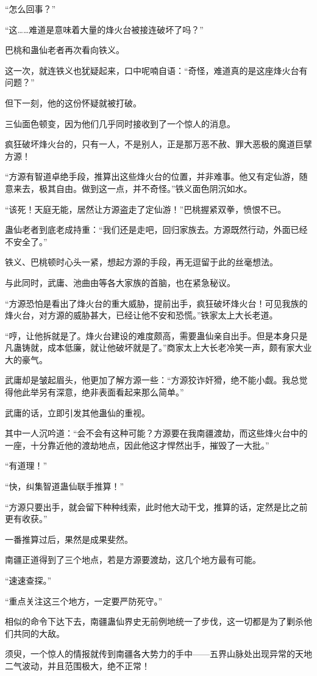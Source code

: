 \begin{this_body}
“怎么回事？”

“这……难道是意味着大量的烽火台被接连破坏了吗？”

巴桃和蛊仙老者再次看向铁义。

这一次，就连铁义也犹疑起来，口中呢喃自语：“奇怪，难道真的是这座烽火台有问题？”

但下一刻，他的这份怀疑就被打破。

三仙面色顿变，因为他们几乎同时接收到了一个惊人的消息。

疯狂破坏烽火台的，只有一人，不是别人，正是那万恶不赦、罪大恶极的魔道巨擘方源！

“方源有智道卓绝手段，推算出这些烽火台的位置，并非难事。他又有定仙游，随意来去，极其自由。做到这一点，并不奇怪。”铁义面色阴沉如水。

“该死！天庭无能，居然让方源盗走了定仙游！”巴桃握紧双拳，愤恨不已。

蛊仙老者到底老成持重：“我们还是走吧，回归家族去。方源既然行动，外面已经不安全了。”

铁义、巴桃顿时心头一紧，想起方源的手段，再无逗留于此的丝毫想法。

与此同时，武庸、池曲由等各大家族的首脑，也在紧急秘议。

“方源恐怕是看出了烽火台的重大威胁，提前出手，疯狂破坏烽火台！可见我族的烽火台，对方源的威胁甚大，已经让他不安和恐慌。”铁家太上大长老道。

“哼，让他拆就是了。烽火台建设的难度颇高，需要蛊仙亲自出手。但是本身只是凡蛊铸就，成本低廉，就让他破坏就是了。”商家太上大长老冷笑一声，颇有家大业大的豪气。

武庸却是皱起眉头，他更加了解方源一些：“方源狡诈奸猾，绝不能小觑。我总觉得他此举另有深意，绝非表面看起来那么简单。”

武庸的话，立即引发其他蛊仙的重视。

其中一人沉吟道：“会不会有这种可能？方源要在我南疆渡劫，而这些烽火台中的一座，十分靠近他的渡劫地点，因此他这才悍然出手，摧毁了一大批。”

“有道理！”

“快，纠集智道蛊仙联手推算！”

“方源只要出手，就会留下种种线索，此时他大动干戈，推算的话，定然是比之前更有收获。”

一番推算过后，果然是成果斐然。

南疆正道得到了三个地点，若是方源要渡劫，这几个地方最有可能。

“速速查探。”

“重点关注这三个地方，一定要严防死守。”

相似的命令下达下去，南疆蛊仙界史无前例地统一了步伐，这一切都是为了剿杀他们共同的大敌。

须臾，一个惊人的情报就传到南疆各大势力的手中——五界山脉处出现异常的天地二气波动，并且范围极大，绝不正常！

\end{this_body}

